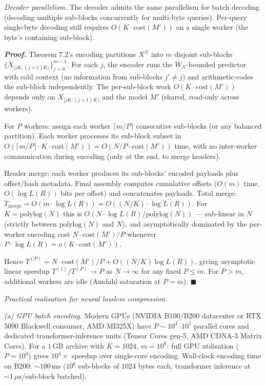 \documentclass[
]{article}
\begin{document}
\emph{Decoder parallelism.} The decoder admits the same parallelism
for batch decoding (decoding multiple sub-blocks concurrently for
multi-byte queries). Per-query single-byte decoding still requires
$O(K \cdot \mathrm{cost}(M'))$ on a single worker (the byte's
containing sub-block).

\emph{\textbf{Proof.}} Theorem 7.2's encoding partitions $X^N$ into $m$
disjoint sub-blocks $\{X_{[jK : (j+1)K)}\}_{j=0}^{m-1}$. For each $j$,
the encoder runs the $W_N$-bounded predictor with cold context
(no information from sub-blocks $j' \neq j$) and arithmetic-codes the
sub-block independently. The per-sub-block work
$O(K \cdot \mathrm{cost}(M'))$ depends only on $X_{[jK : (j+1)K)}$ and
the model $M'$ (shared, read-only across workers).

For $P$ workers: assign each worker $\lceil m/P \rceil$ consecutive
sub-blocks (or any balanced partition). Each worker processes its
sub-block subset in $O(\lceil m/P \rceil \cdot K \cdot \mathrm{cost}(M'))
= O(N/P \cdot \mathrm{cost}(M'))$ time, with no inter-worker
communication during encoding (only at the end, to merge headers).

Header merge: each worker produces its sub-blocks' encoded payloads
plus offset/hash metadata. Final assembly computes cumulative offsets
($O(m)$ time, $O(\log L(R))$ bits per offset) and concatenates
payloads. Total merge: $T_{\mathrm{merge}} = O(m \cdot \log L(R)) =
O((N/K) \cdot \log L(R))$. For $K = \mathrm{polylog}(N)$ this is
$O(N \cdot \log L(R) / \mathrm{polylog}(N))$ --- sub-linear in $N$
(strictly between $\mathrm{polylog}(N)$ and $N$), and asymptotically
dominated by the per-worker encoding cost $N \cdot \mathrm{cost}(M')/P$
whenever $P \cdot \log L(R) = o(K \cdot \mathrm{cost}(M'))$.

Hence
$T^{(P)} = N \cdot \mathrm{cost}(M') / P + O((N/K) \log L(R))$,
giving asymptotic linear speedup $T^{(1)}/T^{(P)} \to P$ as $N \to
\infty$ for any fixed $P \leq m$. For $P > m$, additional workers are
idle (Amdahl saturation at $P = m$).
\hfill$\blacksquare$

\emph{Practical realisation for neural lossless compression.}

\emph{(a) GPU batch encoding.} Modern GPUs (NVIDIA B100/B200 datacenter
or RTX 5090 Blackwell consumer, AMD MI325X) have $P \sim 10^4$--$10^5$
parallel cores and dedicated transformer-inference units (Tensor Cores
gen-5, AMD CDNA-3 Matrix Cores). For a $1\,\mathrm{GB}$ archive with
$K = 1024$, $m = 10^6$: full GPU utilisation ($P = 10^4$) gives
$10^4 \times$ speedup over single-core encoding. Wall-clock encoding
time on B200: $\sim 100\,\mathrm{ms}$ ($10^6$ sub-blocks of $1024$
bytes each, transformer inference at $\sim 1\,\mu\mathrm{s}$/sub-block
batched).
\end{document}
